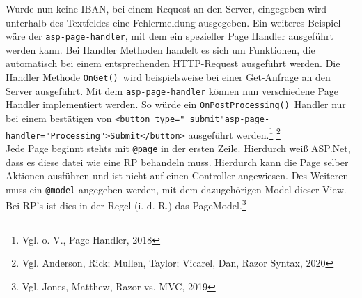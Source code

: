 \documentclass[a4paper,
12pt,
oneside]
{article}
\begin{document}
	Wurde nun keine IBAN, bei einem Request an den Server, eingegeben wird unterhalb des Textfeldes eine Fehlermeldung ausgegeben. Ein weiteres Beispiel wäre der \texttt{asp-page-handler}, mit dem ein spezieller Page Handler ausgeführt werden kann. Bei Handler Methoden handelt es sich um Funktionen, die automatisch bei einem entsprechenden HTTP-Request ausgeführt werden. Die Handler Methode \texttt{OnGet()}~wird beispielsweise bei einer Get-Anfrage an den Server ausgeführt. Mit dem \texttt{asp-page-handler} können nun verschiedene Page Handler implementiert werden. So würde ein  \texttt{OnPostProcessing()}~Handler nur bei einem bestätigen von \texttt{<button type="{} submit"{}asp-page-handler="{}Processing"{}>Submit</button>} ausgeführt werden.\footnote{Vgl. o. V., Page Handler, 2018} \footnote{Vgl. Anderson, Rick; Mullen, Taylor; Vicarel, Dan, Razor Syntax, 2020} \\
	Jede Page beginnt stehts mit \texttt{@page} in der ersten Zeile. Hierdurch weiß ASP.Net, dass es diese datei wie eine RP behandeln muss. Hierdurch kann die Page selber Aktionen ausführen und ist nicht auf einen Controller angewiesen. Des Weiteren muss ein \texttt{@model} angegeben werden, mit dem dazugehörigen Model dieser View. Bei RP's ist dies in der Regel (i. d. R.) das PageModel.\footnote{Vgl. Jones, Matthew, Razor vs. MVC, 2019}
	
	
	
\end{document}
